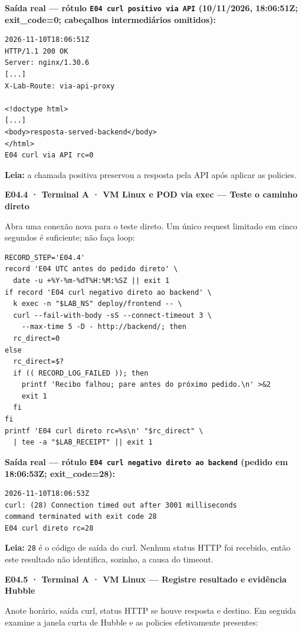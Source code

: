 \documentclass[12pt,openany,oneside,a4paper,chapter=TITLE,english,brazil]{abntex2}
\begin{document}
\clearpage

\textbf{Saída real --- rótulo \texttt{E04 curl positivo via API} (10/11/2026, 18:06:51Z; exit\_code=0; cabeçalhos intermediários omitidos):}

\begin{verbatim}
2026-11-10T18:06:51Z
HTTP/1.1 200 OK
Server: nginx/1.30.6
[...]
X-Lab-Route: via-api-proxy

<!doctype html>
[...]
<body>resposta-served-backend</body>
</html>
E04 curl via API rc=0
\end{verbatim}

\textbf{Leia:} a chamada positiva preservou a resposta pela API após aplicar as policies.

\textbf{E04.4 · Terminal A · VM Linux e POD via exec --- Teste o caminho direto}

Abra uma conexão nova para o teste direto. Um único request limitado em cinco segundos é suficiente; não faça loop:

\begin{verbatim}
RECORD_STEP='E04.4'
record 'E04 UTC antes do pedido direto' \
  date -u +%Y-%m-%dT%H:%M:%SZ || exit 1
if record 'E04 curl negativo direto ao backend' \
  k exec -n "$LAB_NS" deploy/frontend -- \
  curl --fail-with-body -sS --connect-timeout 3 \
    --max-time 5 -D - http://backend/; then
  rc_direct=0
else
  rc_direct=$?
  if (( RECORD_LOG_FAILED )); then
    printf 'Recibo falhou; pare antes do próximo pedido.\n' >&2
    exit 1
  fi
fi
printf 'E04 curl direto rc=%s\n' "$rc_direct" \
  | tee -a "$LAB_RECEIPT" || exit 1
\end{verbatim}

\clearpage

\textbf{Saída real --- rótulo \texttt{E04 curl negativo direto ao backend} (pedido em 18:06:53Z; exit\_code=28):}

\begin{verbatim}
2026-11-10T18:06:53Z
curl: (28) Connection timed out after 3001 milliseconds
command terminated with exit code 28
E04 curl direto rc=28
\end{verbatim}

\textbf{Leia:} \texttt{28} é o código de saída do curl. Nenhum status HTTP foi recebido, então este resultado não identifica, sozinho, a causa do timeout.

\textbf{E04.5 · Terminal A · VM Linux --- Registre resultado e evidência Hubble}

Anote horário, saída curl, status HTTP se houve resposta e destino. Em seguida examine a janela curta de Hubble e as policies efetivamente presentes:
\end{document}
